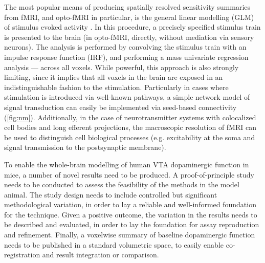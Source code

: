 The most popular means of producing spatially resolved sensitivity summaries from fMRI, and opto-fMRI in particular, is the general linear modelling (GLM) of stimulus evoked activity \cite{Friston1995}.
In this procedure, a precisely specified stimulus train is presented to the brain (in opto-fMRI, directly, without mediation via sensory neurons).
The analysis is performed by convolving the stimulus train with an impulse response function (IRF), and performing a mass univariate regression analysis --- across all voxels.
While powerful, this approach is also strongly limiting, since it implies that all voxels in the brain are exposed in an indistinguishable fashion to the stimulation.
Particularly in cases where stimulation is introduced via well-known pathways, a simple network model of signal transduction can easily be implemented via seed-based connectivity (\cref{fig:nm}).
Additionally, in the case of neurotransmitter systems with colocalized cell bodies and long efferent projections, the macroscopic resolution of fMRI can be used to distinguish cell biological processes (e.g. excitability at the soma and signal transmission to the postsynaptic membrane).

To enable the whole-brain modelling of human VTA dopaminergic function in mice, a number of novel results need to be produced.
A proof-of-principle study needs to be conducted to assess the feasibility of the methods in the model animal.
The study design needs to include controlled but significant methodological variation, in order to lay a reliable and well-informed foundation for the technique. 
Given a positive outcome, the variation in the results needs to be described and evaluated, in order to lay the foundation for assay reproduction and refinement.
Finally, a voxelwise summary of baseline dopaminergic function needs to be published in a standard volumetric space, to easily enable co-registration and result integration or comparison.
